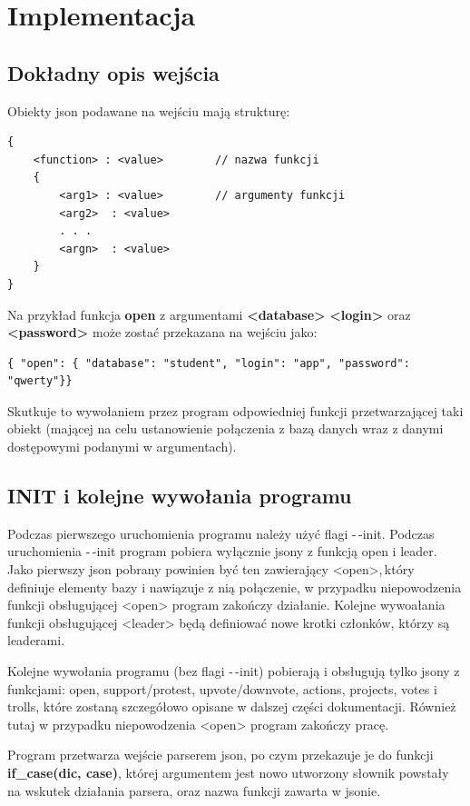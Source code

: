 \documentclass{article}
\begin{document}
\newpage
\section{Implementacja}




\subsection{Dokładny opis wejścia } 
Obiekty json podawane na wejściu mają strukturę: 
\begin{verbatim}
{     
    <function> : <value>        // nazwa funkcji 
    {
        <arg1> : <value>        // argumenty funkcji
        <arg2>  : <value> 
        . . . 
        <argn>  : <value> 
    }
}
\end{verbatim}
Na przykład funkcja \textbf{open} z argumentami \textbf{<database>} \textbf{<login>} oraz \textbf{<password>} może zostać przekazana na wejściu jako:
\begin{verbatim}
{ "open": { "database": "student", "login": "app", "password": "qwerty"}}
\end{verbatim}
Skutkuje to wywołaniem przez program odpowiedniej funkcji przetwarzającej taki obiekt (mającej na celu ustanowienie połączenia z bazą danych wraz z danymi dostępowymi podanymi w argumentach).




\subsection{INIT i kolejne wywołania programu}
Podczas pierwszego uruchomienia programu należy użyć flagi -\,-init.
Podczas uruchomienia -\,-init program pobiera wyłącznie jsony z funkcją open i leader.
Jako pierwszy json pobrany powinien być ten zawierający <open>,\,który definiuje elementy bazy i nawiązuje z nią połączenie,
w przypadku niepowodzenia funkcji obsługującej <open> program zakończy działanie. \newline
Kolejne wywoałania funkcji obsługującej <leader> będą definiować nowe krotki członków, którzy są leaderami. 

Kolejne wywołania programu (bez flagi -\,-init) pobierają i obsługują tylko jsony z funkcjami: 
open, support/protest, upvote/downvote, actions, projects, votes i trolls, 
które zostaną szczegółowo opisane w dalszej części dokumentacji.
Również tutaj w przypadku niepowodzenia <open> program zakończy pracę. 

Program przetwarza wejście parserem json, po czym przekazuje je do funkcji \textbf{if\_case(dic, case)}, 
której argumentem jest nowo utworzony słownik powstały na wskutek działania parsera, oraz nazwa funkcji zawarta w jsonie.
\end{document}
